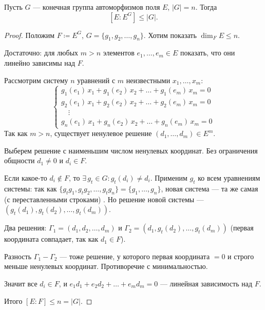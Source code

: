 \begin{theorem}[Артина]
    Пусть $G$ --- конечная группа автоморфизмов поля $E$, $|G| = n$. Тогда
    \[
        [E : E^G] \leq |G|.
    \]

    \begin{proof}
        Положим $F \coloneqq E^G$, $G = \{g_1, g_2, \dots, g_n\}$. Хотим показать $\dim_F E \leq n$.

        Достаточно: для любых $m > n$ элементов $e_1, \dots, e_m \in E$ показать, что они линейно зависимы над $F$.

        Рассмотрим систему $n$ уравнений с $m$ неизвестными $x_1, \dots, x_m$:
        \[
            \begin{cases}
                g_1(e_1)\, x_1 + g_1(e_2)\, x_2 + \dots + g_1(e_m)\, x_m = 0 \\
                g_2(e_1)\, x_1 + g_2(e_2)\, x_2 + \dots + g_2(e_m)\, x_m = 0 \\
                \quad\vdots \\
                g_n(e_1)\, x_1 + g_n(e_2)\, x_2 + \dots + g_n(e_m)\, x_m = 0
            \end{cases}
        \]
        Так как $m > n$, существует ненулевое решение $(d_1, \dots, d_m) \in E^m$.

        Выберем решение с наименьшим числом ненулевых координат. Без ограничения общности $d_1 \neq 0$ и
        $d_i \in F$.

        Если какое-то $d_i \notin F$, то $\exists\, g_t \in G\colon g_t(d_i) \neq d_i$. Применим $g_t$ ко всем уравнениям системы:
        так как $\{g_t g_1, g_t g_2, \dots, g_t g_n\} = \{g_1, \dots, g_n\}$, новая система --- та же самая (с переставленными строками)
        . Но решение новой системы --- $(g_t(d_1), g_t(d_2), \dots, g_t(d_m))$.

        Два решения: $\Gamma_1 = (d_1, d_2, \dots, d_m)$ и $\Gamma_2 = (d_1, g_t(d_2), \dots, g_t(d_m))$ (первая координата совпадает,
        так как $d_1 \in F$).

        Разность $\Gamma_1 - \Gamma_2$ --- тоже решение, у которого первая координата $= 0$ и строго меньше ненулевых координат.
        Противоречие с минимальностью.

        Значит все $d_i \in F$, и $e_1 d_1 + e_2 d_2 + \dots + e_m d_m = 0$ --- линейная зависимость над $F$.

        Итого $[E : F] \leq n = |G|$.
    \end{proof}
\end{theorem}
